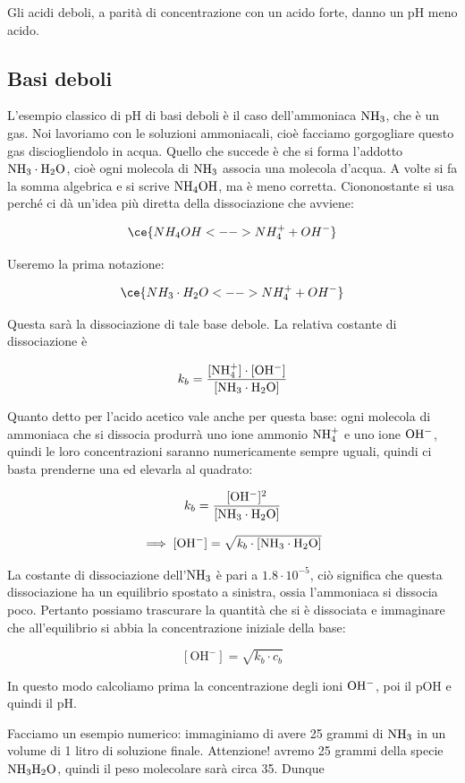 Gli acidi deboli, a parità di concentrazione con un acido forte, danno un pH meno acido. 

\subsection{Basi deboli}

L'esempio classico di pH di basi deboli è il caso dell'ammoniaca $\rm NH_3$, che è un gas. Noi lavoriamo con le soluzioni ammoniacali, cioè facciamo gorgogliare questo gas disciogliendolo in acqua. Quello che succede è che si forma l'addotto $\rm NH_3 \cdot H_2O$, cioè ogni molecola di $\rm NH_3$ associa una molecola d'acqua. A volte si fa la somma algebrica e si scrive $\rm NH_4OH$, ma è meno corretta. Ciononostante si usa perché ci dà un'idea più diretta della dissociazione che avviene:

$$\ce{NH_4OH <--> NH_4^+ + OH^-}$$

Useremo la prima notazione:

$$\ce{NH_3 \cdot H_2O <--> NH_4^+ + OH^-}$$

Questa sarà la dissociazione di tale base debole. La relativa costante di dissociazione è

$$k_b= \frac{\rm{[NH_4^+] \cdot [OH^-]}}{\rm{[NH_3 \cdot H_2O]}}$$

Quanto detto per l'acido acetico vale anche per questa base: ogni molecola di ammoniaca che si dissocia produrrà uno ione ammonio $\rm NH_4^+$ e uno ione $\rm OH^-$, quindi le loro concentrazioni saranno numericamente sempre uguali, quindi ci basta prenderne una ed elevarla al quadrato:

$$k_b= \frac{\rm{[OH^-]^2}}{\rm{[NH_3 \cdot H_2O]}}$$

$$\implies \rm [OH^-] = \sqrt{ \textit{k}_{\textit{b}} \cdot [NH_3 \cdot H_2O]}$$

La costante di dissociazione dell'$\rm NH_3$ è pari a $1.8 \cdot 10^{-5}$, ciò significa che questa dissociazione ha un equilibrio spostato a sinistra, ossia l'ammoniaca si dissocia poco. Pertanto possiamo trascurare la quantità che si è dissociata e immaginare che all'equilibrio si abbia la concentrazione iniziale della base:

$$[\text{OH}^-] = \sqrt{ k_b \cdot c_b}$$

In questo modo calcoliamo prima la concentrazione degli ioni $\rm OH^-$, poi il pOH e quindi il pH.

\vspace{0.2cm}Facciamo un esempio numerico: immaginiamo di avere 25 grammi di $\rm NH_3$ in un volume di 1 litro di soluzione finale. Attenzione! avremo 25 grammi della specie $\rm NH_3H_2O$, quindi il peso molecolare sarà circa 35. Dunque


